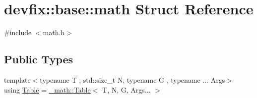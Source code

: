 \hypertarget{structdevfix_1_1base_1_1math}{}\section{devfix\+:\+:base\+:\+:math Struct Reference}
\label{structdevfix_1_1base_1_1math}


{\ttfamily \#include $<$math.\+h$>$}

\subsection*{Public Types}
\begin{DoxyCompactItemize}
\item 
{\footnotesize template$<$typename T , std\+::size\+\_\+t N, typename G , typename ... Args$>$ }\\using \hyperlink{structdevfix_1_1base_1_1math_a6f2114ac2cf825b518cf5fefa00af6e3}{Table} = \hyperlink{structdevfix_1_1base_1_1__math_1_1Table}{\+\_\+math\+::\+Table}$<$ T, N, G, Args... $>$
\end{DoxyCompactItemize}
